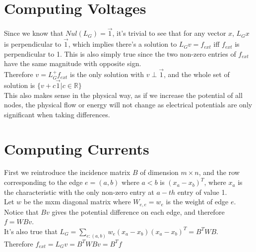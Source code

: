 \documentclass[12pt]{article}
\begin{document}
\section{Computing Voltages}
Since we know that $Nul(L_G) = \vec{1}$, it's trivial to see that for any vector $x$, $L_G x$ is perpendicular to $\vec{1}$, which implies there's a solution to $L_Gv = f_{ext}$ iff $f_{ext}$ is perpendicular to 1. This is also simply true since the two non-zero entries of $f_{ext}$ have the same magnitude with opposite sign.\\
\newline
Therefore $v = L_{G}^+ f_{ext}$ is the only solution with $v \perp \vec{1}$, and the whole set of solution is $\{v + c\vec{1} | c\in \mathbb{R}\}$ \\
\newline
This also makes sense in the physical way, as if we increase the potential of all nodes, the physical flow or energy will not change as electrical potentials are only significant when taking differences.

\section{Computing Currents}
First we reintroduce the incidence matrix $B$ of dimension $m \times n$, and the row corresponding to the edge $e = (a, b)$ where $a < b$ is $(x_a - x_b)^T$, where $x_a$ is the characteristic with the only non-zero entry at $a-th$ entry of value 1.\\
\newline
Let $w$ be the mxm diagonal matrix where $W_{e, e} = w_e$ is the weight of edge $e$.\\
\newline
Notice that $Bv$ gives the potential difference on each edge, and therefore $f = WBv$.\\
\newline
It's also true that $L _ { G } = \sum _ { e : ( a , b ) } w _ { e } \left( x _ { a } - x _ { b } \right) \left( x _ { a } - x _ { b } \right) ^ { T } = B ^ { T } W B$. \\
\newline Therefore $f _ { e x t } = L _ { G } v = B ^ { T } W B v = B ^ { T } f$
\end{document}
